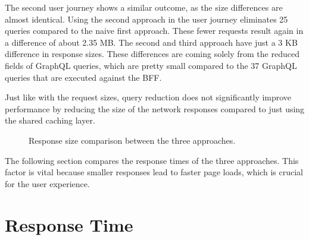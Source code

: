 \bigskip

\noindent The second user journey shows a similar outcome, as the size differences are almost identical. Using the second approach in the user journey eliminates 25 queries compared to the naive first approach. These fewer requests result again in a difference of about 2.35 MB. The second and third approach have just a 3 KB difference in response sizes. These differences are coming solely from the reduced fields of GraphQL queries, which are pretty small compared to the 37 GraphQL queries that are executed against the \ac{BFF}.

\bigskip

\noindent Just like with the request sizes, query reduction does not significantly improve performance by reducing the size of the network responses compared to just using the shared caching layer.

\ifshowImages
\begin{figure}[H]
  \centering
  \caption{Response size comparison between the three approaches.}\label{fig:discussion:response-size}
\end{figure}
\fi

\noindent The following section compares the response times of the three approaches. This factor is vital because smaller responses lead to faster page loads, which is crucial for the user experience.

\section{Response Time}\label{section:discussion:response-times}

